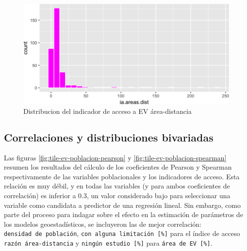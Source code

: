 \documentclass[12pt,a4paper,oneside, openany]{book}
\theoremstyle{definition}
\theoremstyle{definition}
\theoremstyle{definition}
\theoremstyle{remark}
\begin{document}
\begin{figure}[H]

{\centering \includegraphics[width=1\linewidth]{tesis-unigis_files/figure-latex/hist-areasdist-1} 

}

\caption{Distribucion del indicador de acceso a EV área-distancia }\label{fig:hist-areasdist}
\end{figure}

\subsection{Correlaciones y distribuciones
bivariadas}\label{correlaciones-y-distribuciones-bivariadas}

Las figuras \ref{fig:tile-ev-poblacion-pearson} y
\ref{fig:tile-ev-poblacion-spearman} resumen los resultados del cálculo
de los coeficientes de Pearson y Spearman respectivamente de las
variables poblacionales y los indicadores de acceso. Esta relación es
muy débil, y en todas las variables (y para ambos coeficientes de
correlación) es inferior a 0.3, un valor considerado bajo para
seleccionar una variable como candidata a predictor de una regresión
lineal. Sin embargo, como parte del proceso para indagar sobre el efecto
en la estimación de parámetros de los modelos geoestadísticos, se
incluyeron las de mejor correlación: \texttt{densidad\ de\ población},
\texttt{con\ alguna\ limitación\ {[}\%{]}} para el índice de acceso
\texttt{razón\ área-distancia} y \texttt{ningún\ estudio\ {[}\%{]}} para
\texttt{área\ de\ EV\ {[}\%{]}}.
\end{document}
